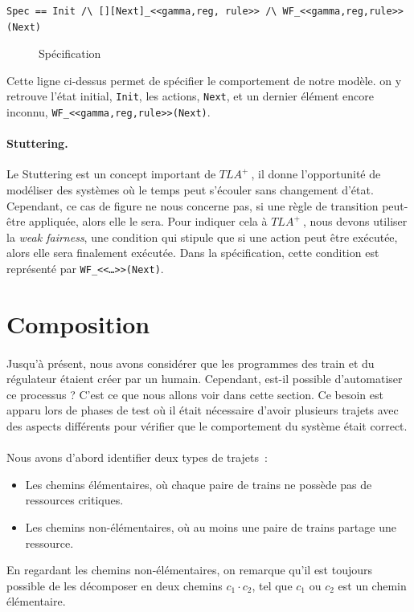 \documentclass[oneside, a4paper, 11pt]{book}
\newcommand{\TLA}{\ensuremath{TLA^+~}}
\begin{document}
\begin{verbatim}
Spec == Init /\ [][Next]_<<gamma,reg, rule>> /\ WF_<<gamma,reg,rule>>(Next)
\end{verbatim}

\begin{figure}[h]
	\caption{Spécification}
	\label{fig:specTLA}
\end{figure}

Cette ligne ci-dessus permet de spécifier le comportement de notre modèle. on y retrouve l'état initial, \texttt{Init}, les actions, \texttt{Next}, et un dernier élément encore inconnu, \texttt{WF\_<<gamma,reg,rule>>(Next)}. 

\paragraph{Stuttering.} Le Stuttering est un concept important de \TLA, il donne l'opportunité de modéliser des systèmes où le temps peut s'écouler sans changement d'état. Cependant, ce cas de figure ne nous concerne pas, si une règle de transition peut-être appliquée, alors elle le sera.
Pour indiquer cela à \TLA, nous devons utiliser la \textit{weak fairness}, une condition qui stipule que si une action peut être exécutée, alors elle sera finalement exécutée. Dans la spécification, cette condition est représenté par \texttt{WF\_<<\dots>>(Next)}.



\section{Composition}
\label{sec:composition}

\paragraph{} Jusqu'à présent, nous avons considérer que les programmes des train et du régulateur étaient créer par un humain. Cependant, est-il possible d'automatiser ce processus ? C'est ce que nous allons voir dans cette section.
Ce besoin est apparu lors de phases de test où il était nécessaire d'avoir plusieurs trajets avec des aspects différents pour vérifier que le comportement du système était correct.

\paragraph{}Nous avons d'abord identifier deux types de trajets~:
\begin{itemize}
	\item Les chemins élémentaires, où chaque paire de trains ne possède pas de ressources critiques.
	\item Les chemins non-élémentaires, où au moins une paire de trains partage une ressource.
\end{itemize}
En regardant les chemins non-élémentaires, on remarque qu'il est toujours possible de les décomposer en deux chemins $c_1 \cdot c_2$, tel que $c_1$ ou $c_2$ est un chemin élémentaire.
\end{document}
